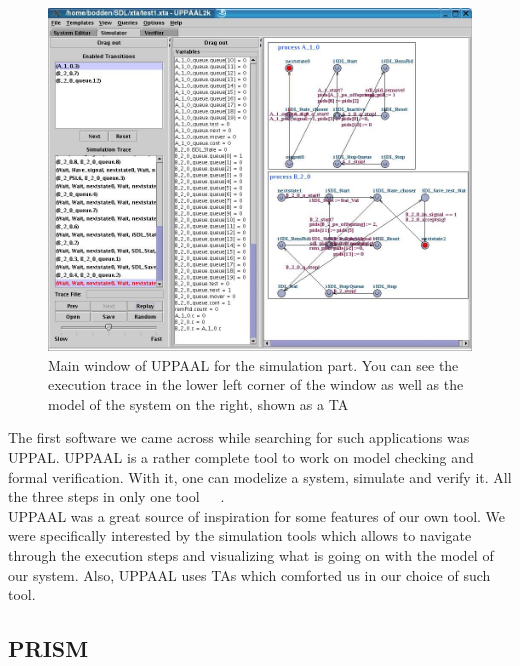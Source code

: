\documentclass[12pt]{article}
\theoremstyle{definition}
\theoremstyle{definition}
\theoremstyle{remark}
\begin{document}
\begin{figure}
    \centering
    \includegraphics[scale=0.3]{UPPAAL_trace.jpg}
    \caption{Main window of UPPAAL for the simulation part. You can see the execution trace in the lower left corner of the window as well as the model of the system on the right, shown as a TA}
    \label{UPPAAL}
\end{figure}

The first software we came across while searching for such applications was UPPAL. UPPAAL is a rather complete tool to work on model checking and formal verification. With it, one can modelize a system, simulate and verify it. All the three steps in only one tool~\cite{Bengtsson1996}~\cite{Behrmann2004}~\cite{Larsen1997}.\\

UPPAAL was a great source of inspiration for some features of our own tool. We were specifically interested by the simulation tools which allows to navigate through the execution steps and visualizing what is going on with the model of our system. Also, UPPAAL uses TAs which comforted us in our choice of such tool.\\


\subsection{PRISM}
\end{document}
